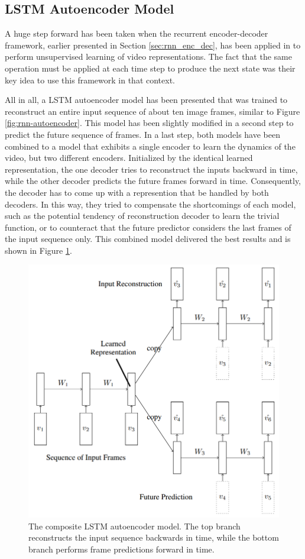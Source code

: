 \subsection{LSTM Autoencoder Model}

A huge step forward has been taken when the recurrent encoder-decoder framework, earlier presented in Section \ref{sec:rnn_enc_dec}, has been applied in \parencite{unsup_learn_lstm} to perform unsupervised learning of video representations. The fact that the same operation must be applied at each time step to produce the next state was their key idea to use this framework in that context. 

All in all, a LSTM autoencoder model has been presented that was trained to reconstruct an entire input sequence of about ten image frames, similar to Figure \ref{fig:rnn-autoencoder}. This model has been slightly modified in a second step to predict the future sequence of frames. In a last step, both models have been combined to a model that exhibits a single encoder to learn the dynamics of the video, but two different encoders. Initialized by the identical learned representation, the one decoder tries to reconstruct the inputs backward in time, while the other decoder predicts the future frames forward in time. Consequently, the decoder has to come up with a represention that be handled by both decoders. In this way, they tried to compensate the shortcomings of each model, such as the potential tendency of reconstruction decoder to learn the trivial function, or to counteract that the future predictor considers the last frames of the input sequence only. This combined model delivered the best results and is shown in Figure \ref{fig:lstm_combo}.

\begin{figure}[htb]
	\centering
	\includegraphics[width=0.5\linewidth]{figures/related/combo_shrinked.png} 
	\caption[Composite LSTM Autoencoder Model]{The composite LSTM autoencoder model. The top branch reconstructs the input sequence backwards in time, while the bottom branch performs frame predictions forward in time.} \label{fig:lstm_combo}
\end{figure}

